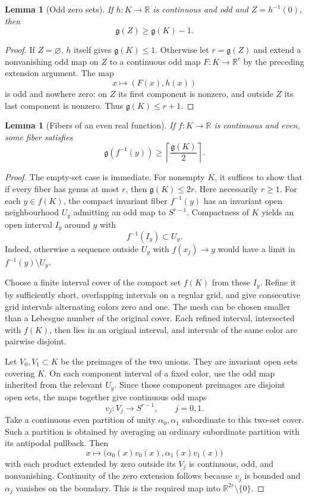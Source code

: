 \documentclass[11pt,a4paper]{article}
\newtheorem{lemma}[theorem]{Lemma}
\theoremstyle{remark}
\newcommand{\R}{\mathbb R}
\newcommand{\gen}{\mathfrak g}
\begin{document}
\begin{lemma}[Odd zero sets]\label{lem:oddzero}
If $h:K\to\R$ is continuous and odd and $Z=h^{-1}(0)$, then
\[
 \gen(Z)\ge\gen(K)-1.
\]
\end{lemma}
\begin{proof}
If $Z=\varnothing$, $h$ itself gives $\gen(K)\le1$. Otherwise let $r=\gen(Z)$ and extend a nonvanishing odd map on $Z$ to a continuous odd map $F:K\to\R^r$ by the preceding extension argument. The map
\[
 x\longmapsto(F(x),h(x))
\]
is odd and nowhere zero: on $Z$ its first component is nonzero, and outside $Z$ its last component is nonzero. Thus $\gen(K)\le r+1$.
\end{proof}

\begin{lemma}[Fibers of an even real function]\label{lem:evenfiber}
If $f:K\to\R$ is continuous and even, some fiber satisfies
\[
 \gen(f^{-1}(y))\ge\left\lceil\frac{\gen(K)}2\right\rceil.
\]
\end{lemma}
\begin{proof}
The empty-set case is immediate. For nonempty $K$, it suffices to show that if every fiber has genus at most $r$, then $\gen(K)\le2r$. Here necessarily $r\ge1$. For each $y\in f(K)$, the compact invariant fiber $f^{-1}(y)$ has an invariant open neighbourhood $U_y$ admitting an odd map to $S^{r-1}$. Compactness of $K$ yields an open interval $I_y$ around $y$ with
\[
 f^{-1}(I_y)\subset U_y.
\]
Indeed, otherwise a sequence outside $U_y$ with $f(x_j)\to y$ would have a limit in $f^{-1}(y)\setminus U_y$.

Choose a finite interval cover of the compact set $f(K)$ from these $I_y$. Refine it by sufficiently short, overlapping intervals on a regular grid, and give consecutive grid intervals alternating colors zero and one. The mesh can be chosen smaller than a Lebesgue number of the original cover. Each refined interval, intersected with $f(K)$, then lies in an original interval, and intervals of the same color are pairwise disjoint.

Let $V_0,V_1\subset K$ be the preimages of the two unions. They are invariant open sets covering $K$. On each component interval of a fixed color, use the odd map inherited from the relevant $U_y$. Since those component preimages are disjoint open sets, the maps together give continuous odd maps
\[
 v_j:V_j\to S^{r-1},\qquad j=0,1.
\]
Take a continuous even partition of unity $\alpha_0,\alpha_1$ subordinate to this two-set cover. Such a partition is obtained by averaging an ordinary subordinate partition with its antipodal pullback. Then
\[
 x\longmapsto\bigl(\alpha_0(x)v_0(x),\alpha_1(x)v_1(x)\bigr)
\]
with each product extended by zero outside its $V_j$ is continuous, odd, and nonvanishing. Continuity of the zero extension follows because $v_j$ is bounded and $\alpha_j$ vanishes on the boundary. This is the required map into $\R^{2r}\setminus\{0\}$.
\end{proof}
\end{document}
